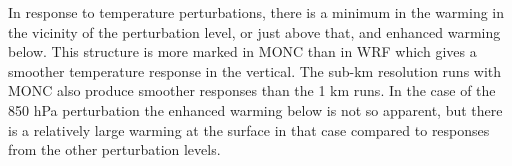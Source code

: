 \documentclass[draft]{agujournal2019}
\begin{document}




In response to temperature perturbations, there is a minimum in the warming in
the vicinity of the perturbation level, or just above that, and enhanced warming
below. This structure is more marked in MONC than in WRF which gives a smoother
temperature response in the vertical. The sub-km resolution runs with MONC also
produce smoother responses than the 1 km runs. In the case of the 850 hPa
perturbation the enhanced warming below is not so apparent, but there is a
relatively large warming at the surface in that case compared to responses from
the other perturbation levels.
\end{document}
